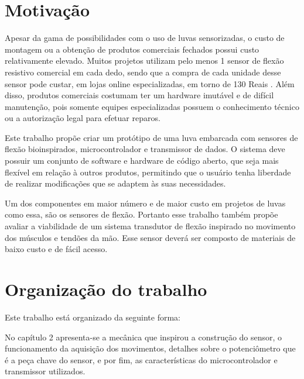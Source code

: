 \documentclass[
	12pt,				%
	openright,			%
	oneside,			%
	a4paper,			%
	english,			%
	brazil				%
	]{abntex2}
\begin{document}

		
		
		
		\section{Motivação}

		Apesar da gama de possibilidades com o uso de luvas sensorizadas, o custo de montagem ou a obtenção de produtos comerciais fechados possui custo relativamente elevado. Muitos projetos utilizam pelo menos 1 sensor de flexão resistivo comercial em cada dedo, sendo que a compra de cada unidade desse sensor pode custar, em lojas online especializadas, em torno de 130 Reais \cite{multilogicaflexsensor}. Além disso, produtos comerciais costumam ter um hardware imutável e de difícil manutenção, pois somente equipes especializadas possuem o conhecimento técnico ou a autorização legal para efetuar reparos.

		Este trabalho propõe criar um protótipo de uma luva embarcada com sensores de flexão bioinspirados, microcontrolador e transmissor de dados. O sistema deve possuir um conjunto de software e hardware de código aberto, que seja mais flexível em relação à outros produtos, permitindo que o usuário tenha liberdade de realizar modificações que se adaptem às suas necessidades. 

		Um dos componentes em maior número e de maior custo em projetos de luvas como essa, são os sensores de flexão. Portanto esse trabalho também propõe avaliar a viabilidade de um sistema transdutor de flexão inspirado no movimento dos músculos e tendões da mão. Esse sensor deverá ser composto de materiais de baixo custo e de fácil acesso.

		
		\section{Organização do trabalho}

		Este trabalho está organizado da seguinte forma:

		No capítulo 2 apresenta-se a mecânica que inspirou a construção do sensor, o funcionamento da aquisição dos movimentos, detalhes sobre o potenciômetro que é a peça chave do sensor, e por fim, as características do microcontrolador e transmissor utilizados.
		
\end{document}

